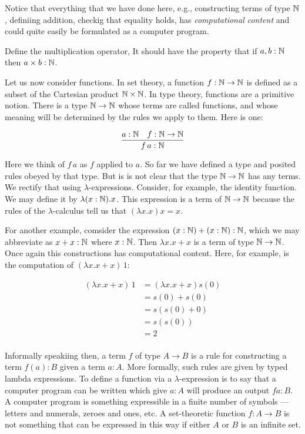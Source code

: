 Notice that everything that we have done here, e.g., constructing terms of type $\mathbb{N}$, definiing addition, checkig that equality holds, has \emph{computational content} and could quite easily be formulated as a computer program.


 Define the multiplication operator,  It should have the property that if $a, b : \mathbb{N}$ then $a \times b : \mathbb{N}$.

Let us now consider functions.  In set theory, a function $f: \mathbb{N} \to \mathbb{N}$ is defined as a subset of the Cartesian product $\mathbb{N} \times \mathbb{N}$.  In type theory, functions are a primitive notion.  There is a type $\mathbb{N} \to \mathbb{N}$ whose terms are called functions, and whose meaning will be determined by the rules we apply to them.   Here is one:

$$
\frac{a : \mathbb{N} \quad f : \mathbb{N} \to \mathbb{N}}{f\, a : \mathbb{N}}
$$

Here we think of $f\, a$ as $f$ applied to $a$.  So far we have defined a type and posited rules obeyed by that type.  But is is not clear that  the type $\mathbb{N} \to \mathbb{N}$ has any terms.  We rectify that using $\lambda$-expressions.
Consider, for example, the identity function.  We may define it by  $\lambda (x:\mathbb{N}).x$.  This expression is a term of $\mathbb{N} \to \mathbb{N}$ because the rules of the $\lambda$-calculus tell us that $(\lambda x.x) x = x$.


For another example, comsider the expression $(x:\mathbb{N}) + (x:\mathbb{N}):\mathbb{N}$, which we may abbreviate as $x + x: \mathbb{N}$ where $x: \mathbb{N}$.  Then $\lambda x. x + x$ is a term of type $\mathbb{N} \to \mathbb{N}$. Once again this constructions has computational content.  Here, for example, is the computation of $(\lambda x.x + x)\,1$:

\begin{align}
(\lambda x.x + x) \,1 &= (\lambda x.x + x) s(0) \\
&=  s(0) + s(0) \\
&= s(s(0) + 0)\\
&= s(s(0)) \\
&= 2 \\
\end{align}

Informally speakiing then, a term $f$ of type $A \to B$ is a rule for constructing a term $f(a): B$ given a term $a:A$.  More formally, such rules are given by typed lambda expressions.  To define a function via a $\lambda$-expression is to say that a computer program can be written which give $a: A$ will produce an output $f a : B$.  A computer program is something expressible in a finite number of symbols — letters and numerals, zeroes and ones, etc.  A set-theoretic function $f : A \to B$ is not something that can be expressed in this way if either $A$ or $B$ is an infinite set.


